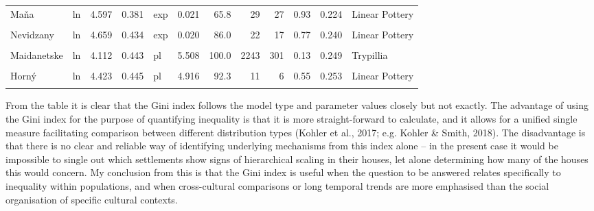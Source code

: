 \documentclass[
  12pt,
]{book}
\begin{document}
\begin{landscape}
\begin{table}
\begin{tabular}[t]{llrrlrrrrrrl}
Maňa & ln & 4.597 & 0.381 & exp & 0.021 & 65.8 & 29 & 27 & 0.93 & 0.224 & Linear Pottery\\
\cellcolor{gray!6}{Čierne} & \cellcolor{gray!6}{ln} & \cellcolor{gray!6}{4.703} & \cellcolor{gray!6}{0.376} & \cellcolor{gray!6}{exp} & \cellcolor{gray!6}{0.021} & \cellcolor{gray!6}{89.2} & \cellcolor{gray!6}{49} & \cellcolor{gray!6}{36} & \cellcolor{gray!6}{0.73} & \cellcolor{gray!6}{0.211} & \cellcolor{gray!6}{Linear Pottery}\\
Nevidzany & ln & 4.659 & 0.434 & exp & 0.020 & 86.0 & 22 & 17 & 0.77 & 0.240 & Linear Pottery\\
\cellcolor{gray!6}{Moshuriv} & \cellcolor{gray!6}{ln} & \cellcolor{gray!6}{4.211} & \cellcolor{gray!6}{0.395} & \cellcolor{gray!6}{pl} & \cellcolor{gray!6}{6.306} & \cellcolor{gray!6}{85.3} & \cellcolor{gray!6}{84} & \cellcolor{gray!6}{29} & \cellcolor{gray!6}{0.35} & \cellcolor{gray!6}{0.219} & \cellcolor{gray!6}{Trypillia}\\
Maidanetske & ln & 4.112 & 0.443 & pl & 5.508 & 100.0 & 2243 & 301 & 0.13 & 0.249 & Trypillia\\
\addlinespace
\cellcolor{gray!6}{Vráble 'VL'} & \cellcolor{gray!6}{ln} & \cellcolor{gray!6}{4.198} & \cellcolor{gray!6}{0.389} & \cellcolor{gray!6}{pl} & \cellcolor{gray!6}{5.235} & \cellcolor{gray!6}{83.6} & \cellcolor{gray!6}{313} & \cellcolor{gray!6}{91} & \cellcolor{gray!6}{0.29} & \cellcolor{gray!6}{0.221} & \cellcolor{gray!6}{Linear Pottery}\\
Horný & ln & 4.423 & 0.445 & pl & 4.916 & 92.3 & 11 & 6 & 0.55 & 0.253 & Linear Pottery\\
\cellcolor{gray!6}{Nebelivka} & \cellcolor{gray!6}{ln} & \cellcolor{gray!6}{4.045} & \cellcolor{gray!6}{0.432} & \cellcolor{gray!6}{pl} & \cellcolor{gray!6}{4.764} & \cellcolor{gray!6}{62.6} & \cellcolor{gray!6}{1435} & \cellcolor{gray!6}{629} & \cellcolor{gray!6}{0.44} & \cellcolor{gray!6}{0.239} & \cellcolor{gray!6}{Trypillia}\\
\bottomrule
\end{tabular}
\end{table}
\end{landscape}

From the table it is clear that the Gini index follows the model type and parameter values closely but not exactly. The advantage of using the Gini index for the purpose of quantifying inequality is that it is more straight-forward to calculate, and it allows for a unified single measure facilitating comparison between different distribution types (Kohler et al., 2017; e.g. Kohler \& Smith, 2018). The disadvantage is that there is no clear and reliable way of identifying underlying mechanisms from this index alone -- in the present case it would be impossible to single out which settlements show signs of hierarchical scaling in their houses, let alone determining how many of the houses this would concern. My conclusion from this is that the Gini index is useful when the question to be answered relates specifically to inequality within populations, and when cross-cultural comparisons or long temporal trends are more emphasised than the social organisation of specific cultural contexts.
\end{document}
